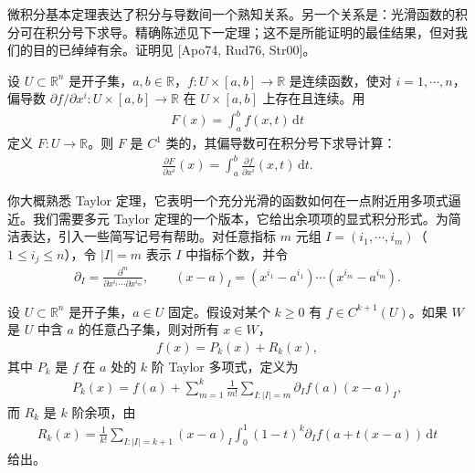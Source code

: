 \documentclass[../../main.tex]{subfiles}
\begin{document}
微积分基本定理表达了积分与导数间一个熟知关系。另一个关系是：光滑函数的积分可在积分号下求导。精确陈述见下一定理；这不是所能证明的最佳结果，但对我们的目的已绰绰有余。证明见 [Apo74, Rud76, Str00]。

\begin{theorem}[积分号下求导]\label{theorem:appC-differentiate-under-integral}
设 $U\subset\mathbb R^n$ 是开子集，$a,b\in\mathbb R$，$f:U\times[a,b]\to\mathbb R$ 是连续函数，使对 $i=1,\cdots ,n$，偏导数 $\partial f/\partial x^i:U\times[a,b]\to\mathbb R$ 在 $U\times[a,b]$ 上存在且连续。用
\begin{align*}
F(x)=\int_a^b f(x,t)\,\mathrm{d}t
\end{align*}
定义 $F:U\to\mathbb R$。则 $F$ 是 $C^1$ 类的，其偏导数可在积分号下求导计算：
\begin{align*}
\frac{\partial F}{\partial x^i}(x)=\int_a^b\frac{\partial f}{\partial x^i}(x,t)\,\mathrm{d}t.
\end{align*}
\end{theorem}

你大概熟悉 Taylor 定理，它表明一个充分光滑的函数如何在一点附近用多项式逼近。我们需要多元 Taylor 定理的一个版本，它给出余项项的显式积分形式。为简洁表达，引入一些简写记号有帮助。对任意指标 $m$ 元组 $I=(i_1,\cdots ,i_m)$（$1\leqslant i_j\leqslant n$），令 $|I|=m$ 表示 $I$ 中指标个数，并令
\begin{align*}
\partial_I=\frac{\partial^m}{\partial x^{i_1}\cdots\partial x^{i_m}},\qquad
(x-a)_I=(x^{i_1}-a^{i_1})\cdots(x^{i_m}-a^{i_m}).
\end{align*}

\begin{theorem}[Taylor 定理]\label{theorem:appC-taylor}
设 $U\subset\mathbb R^n$ 是开子集，$a\in U$ 固定。假设对某个 $k\geqslant0$ 有 $f\in C^{k+1}(U)$。如果 $W$ 是 $U$ 中含 $a$ 的任意凸子集，则对所有 $x\in W$，
\begin{align}\label{align:appC-taylor}
f(x)=P_k(x)+R_k(x),
\end{align}
其中 $P_k$ 是 $f$ 在 $a$ 处的 $k$ 阶 Taylor 多项式，定义为
\begin{align}\label{align:appC-taylor-poly}
P_k(x)=f(a)+\sum_{m=1}^k\frac{1}{m!}\sum_{I:|I|=m}\partial_I f(a)(x-a)_I,
\end{align}
而 $R_k$ 是 $k$ 阶余项，由
\begin{align}\label{align:appC-taylor-remainder}
R_k(x)=\frac{1}{k!}\sum_{I:|I|=k+1}(x-a)_I\int_0^1(1-t)^k\partial_I f(a+t(x-a))\,\mathrm{d}t
\end{align}
给出。
\end{theorem}
\end{document}

